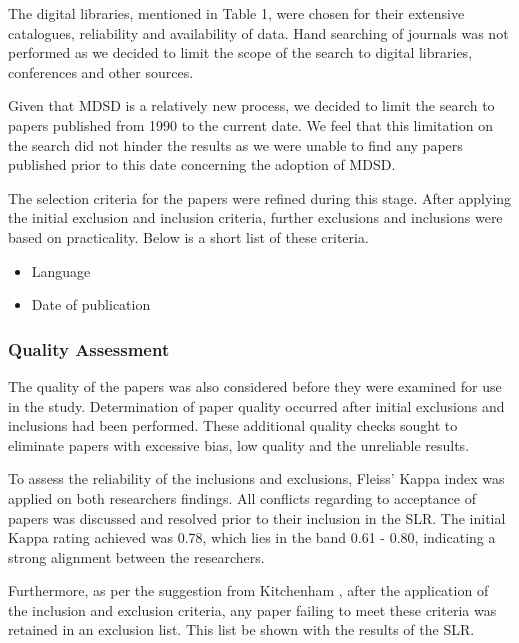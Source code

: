 \documentclass[10pt,twocolumn]{article}
\begin{document}
The digital libraries, mentioned in Table 1, were chosen for their extensive catalogues, reliability and availability of data. Hand searching of journals was not performed as we decided to limit the scope of the search to digital libraries, conferences and other sources.

Given that MDSD is a relatively new process, we decided to limit the search to papers published from 1990 to the current date. We feel that this limitation on the search did not hinder the results as we were unable to find any papers published prior to this date concerning the adoption of MDSD.

The selection criteria for the papers were refined during this stage. After applying the initial exclusion and inclusion criteria, further exclusions and inclusions were based on practicality. Below is a short list of these criteria.

\begin{itemize}
\item Language
\item Date of publication
\end{itemize}

\subsubsection{Quality Assessment}

The quality of the papers was also considered before they were examined for use in the study. Determination of paper quality occurred after initial exclusions and inclusions had been performed. These additional quality checks sought to eliminate papers with excessive bias, low quality and the unreliable results.


To assess the reliability of the inclusions and exclusions, Fleiss' Kappa index was applied on both researchers findings. All conflicts regarding to acceptance of papers was discussed and resolved prior to their inclusion in the SLR. The initial Kappa rating achieved was 0.78, which lies in the band 0.61 - 0.80, indicating a strong alignment between the researchers. 

Furthermore, as per the suggestion from Kitchenham \cite{kitchenham2007guidelines}, after the application of the inclusion and exclusion criteria, any paper failing to meet these criteria was retained in an exclusion list. This list be shown with the results of the SLR.
\end{document}
